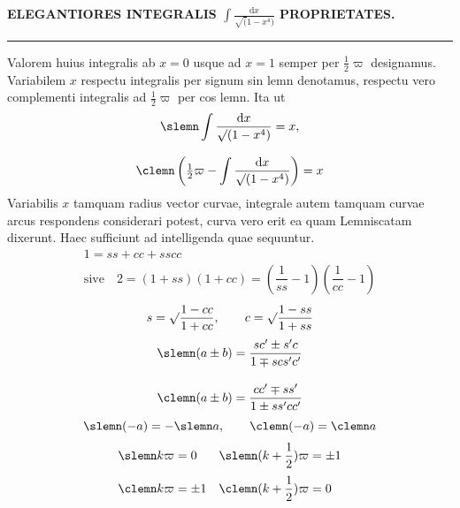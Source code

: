 \clearpage{}

\begin{center}
\textbf{ELEGANTIORES INTEGRALIS $\displaystyle\int\frac{\mathrm{d}x}{\surd(1-x^4)}$ PROPRIETATES.}
\end{center}
\par\begin{center}\rule{.22\linewidth}{.3pt}\end{center}
Valorem huius integralis ab $x=0$ usque ad $x=1$ semper per $\frac12\varpi$ designamus. Variabilem $x$ respectu integralis per signum sin lemn denotamus, respectu vero complementi integralis ad $\frac12\varpi$ per cos lemn. Ita ut
\[
\begin{gathered}\slemn\int\dfrac{\mathrm{d}x}{\surd(1-x^4)}=x,\\[8pt]
\clemn\left(\tfrac12\varpi-\int\dfrac{\mathrm{d}x}{\surd(1-x^4)}\right)=x\end{gathered}
\]
Variabilis $x$ tamquam radius vector curvae, integrale autem tamquam curvae arcus respondens considerari potest, curva vero erit ea quam Lemniscatam dixerunt. Haec sufficiunt ad intelligenda quae sequuntur.
\[
\begin{gathered}1=ss+cc+sscc\\[6pt]\text{sive}\quad
2=(1+ss)(1+cc)=\left(\dfrac1{ss}-1\right)\left(\dfrac1{cc}-1\right)\end{gathered}
\]
\[
s=\surd\dfrac{1-cc}{1+cc},\qquad c=\surd\dfrac{1-ss}{1+ss}
\]
\[
\begin{aligned}
\slemn(a\pm b)&=\dfrac{sc'\pm s'c}{1\mp scs'c'}\\[10pt]
\clemn(a\pm b)&=\dfrac{cc'\mp ss'}{1\pm ss'cc'}
\end{aligned}
\]
\[
\slemn(-a)=-\slemn a,\qquad \clemn(-a)=\clemn a
\]
\[
\begin{array}{ll}
\slemn k\varpi=0&\slemn(k+\dfrac12)\varpi=\pm1\\[10pt]
\clemn k\varpi=\pm1&\clemn(k+\dfrac12)\varpi=0
\end{array}
\]



